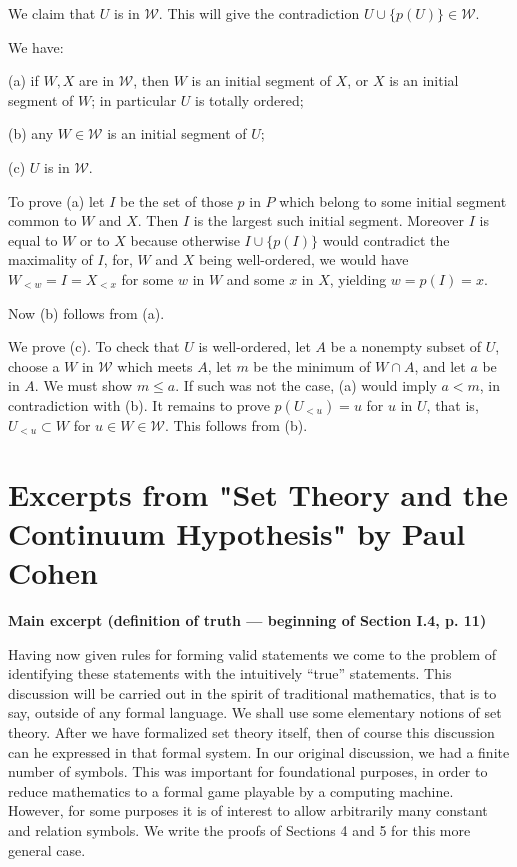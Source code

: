 \documentclass[12pt]{article}
\begin{document}
We claim that $U$ is in $\mathcal W$. This will give the contradiction $U\cup\{p(U)\}\in\mathcal W$. 

We have: 

(a) if $W,X$ are in $\mathcal W$, then $W$ is an initial segment of $X$, or $X$ is an initial segment of $W$; in particular $U$ is totally ordered;

(b) any $W\in\mathcal W$ is an initial segment of $U$; 

(c) $U$ is in $\mathcal W$.

To prove (a) let $I$ be the set of those $p$ in $P$ which belong to some initial segment common to $W$ and $X$. Then $I$ is the largest such initial segment. Moreover $I$ is equal to $W$ or to $X$ because otherwise $I\cup\{p(I)\}$ would contradict the maximality of $I$, for, $W$ and $X$ being well-ordered, we would have $W_{<w}=I=X_{<x}$ for some $w$ in $W$ and some $x$ in $X$, yielding $w=p(I)=x$. 

Now (b) follows from (a). 

We prove (c). To check that $U$ is well-ordered, let $A$ be a nonempty subset of $U$, choose a $W$ in $\mathcal W$ which meets $A$, let $m$ be the minimum of $W\cap A$, and let $a$ be in $A$. We must show $m\le a$. If such was not the case, (a) would imply $a<m$, in contradiction with (b). It remains to prove $p(U_{<u})=u$ for $u$ in $U$, that is, $U_{<u}\subset W$ for $u\in W\in\mathcal W$. This follows from (b). 
% 
\newpage 
%
\section{Excerpts from "Set Theory and the Continuum Hypothesis" by Paul Cohen} 
%
\centerline{\textbf{Main excerpt (definition of truth --- beginning of Section I.4, p. 11)}}

Having now given rules for forming valid statements we come to the problem of identifying these statements with the intuitively ``true'' statements. This discussion will be carried out in the spirit of traditional mathematics, that is to say, outside of any formal language. We shall use some elementary notions of set theory. After we have formalized set theory itself, then of course this discussion can he expressed in that formal system. In our original discussion, we had a finite number of symbols. This was important for foundational purposes, in order to reduce mathematics to a formal game playable by a computing machine. However, for some purposes it is of interest to allow arbitrarily many constant and relation symbols. We write the proofs of Sections 4 and 5 for this more general case.
\end{document}
